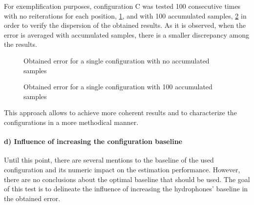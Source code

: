 For exemplification purposes, configuration C was tested 100 consecutive times with no reiterations for each position, \ref{fig:plot-accum0}, and with 100 accumulated samples, \ref{fig:plot-accum100} in order to verify the dispersion of the obtained results. As it is observed, when the error is averaged with accumulated samples, there is a smaller discrepancy among the results.

\begin{figure}[!htbp]
	\captionsetup{justification=centering,margin=2cm}
	\caption{Obtained error for a single configuration with no accumulated samples}
	\label{fig:plot-accum0}
\end{figure}

\begin{figure}[!htbp]
	\captionsetup{justification=centering,margin=2cm}
	\caption{Obtained error for a single configuration with 100 accumulated samples}
	\label{fig:plot-accum100}
\end{figure}

This approach allows to achieve more coherent results and to characterize the configurations in a more methodical manner.

\paragraph{d) Influence of increasing the configuration baseline}

Until this point, there are several mentions to the baseline of the used configuration and its numeric impact on the estimation performance. However, there are no conclusions about the optimal baseline that should be used. The goal of this test is to delineate the influence of increasing the hydrophones' baseline in the obtained error. 

